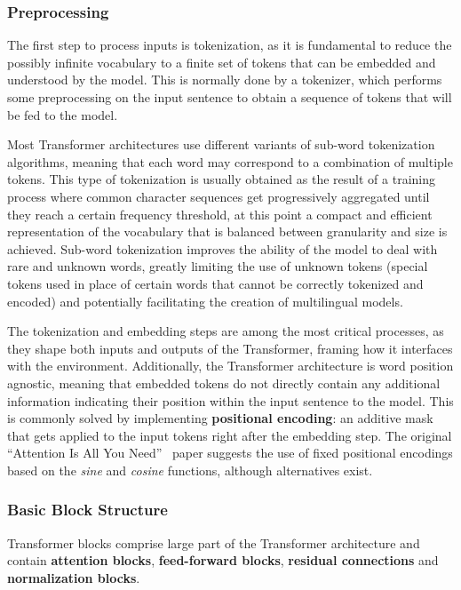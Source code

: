 \subsubsection*{Preprocessing}

The first step to process inputs is tokenization, as it is fundamental to reduce the possibly infinite vocabulary to a finite set of tokens that can be embedded and understood by the model.
This is normally done by a tokenizer, which performs some preprocessing on the input sentence to obtain a sequence of tokens that will be fed to the model.

Most Transformer architectures use different variants of sub-word tokenization algorithms, meaning that each word may correspond to a combination of multiple tokens.
This type of tokenization is usually obtained as the result of a training process where common character sequences get progressively aggregated until they reach a certain frequency threshold, at this point a compact and efficient representation of the vocabulary that is balanced between granularity and size is achieved.
Sub-word tokenization improves the ability of the model to deal with rare and unknown words, greatly limiting the use of unknown tokens (special tokens used in place of certain words that cannot be correctly tokenized and encoded) and potentially facilitating the creation of multilingual models.

The tokenization and embedding steps are among the most critical processes, as they shape both inputs and outputs of the Transformer, framing how it interfaces with the environment.
Additionally, the Transformer architecture is word position agnostic, meaning that embedded tokens do not directly contain any additional information indicating their position within the input sentence to the model.
This is commonly solved by implementing \textbf{positional encoding}: an additive mask that gets applied to the input tokens right after the embedding step.
The original ``Attention Is All You Need''~\cite{vaswani2017} paper suggests the use of fixed positional encodings based on the \emph{sine} and \emph{cosine} functions, although alternatives exist.

\subsubsection*{Basic Block Structure}

Transformer blocks comprise large part of the Transformer architecture and contain \textbf{attention blocks}, \textbf{feed-forward blocks}, \textbf{residual connections} and \textbf{normalization blocks}.

